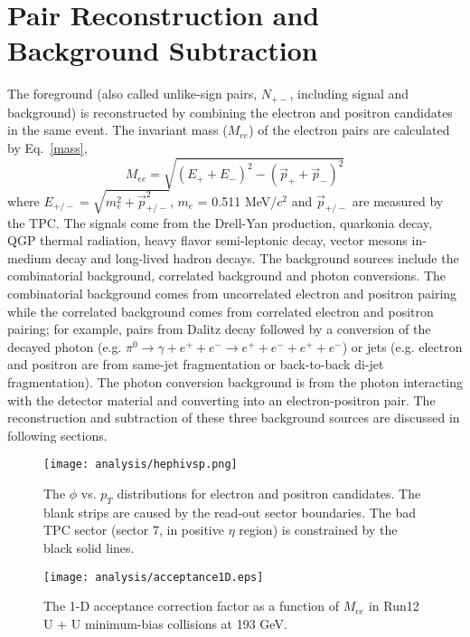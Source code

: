 \section{Pair Reconstruction and Background Subtraction}
\label{invmass}
The foreground (also called unlike-sign pairs, $N_{+-}$, including signal and background) is reconstructed by combining the electron and positron candidates in the same event. The invariant mass ($M_{ee}$) of the electron pairs are calculated by Eq.~\ref{mass}, 
\begin{equation}
M_{ee} = \sqrt{ (E_{+} + E_{-})^{2} - (\overrightarrow{p}_{+} + \overrightarrow{p}_{-})^{2}}
\label{mass}
\end{equation}
where $E_{+/-} = \sqrt{m_{e}^{2} + \overrightarrow{p}_{+/-}^{2}}$, $m_{e}$ = 0.511 MeV/$c^{2}$ and $\overrightarrow{p}_{+/-}$ are measured by the TPC. The signals come from the Drell-Yan production, quarkonia decay, QGP thermal radiation, heavy flavor semi-leptonic decay, vector mesons in-medium decay and long-lived hadron decays. The background sources include the combinatorial background, correlated background and photon conversions. The combinatorial background comes from uncorrelated electron and positron pairing while the correlated background comes from correlated electron and positron pairing; for example, pairs from Dalitz decay followed by a conversion of the decayed photon (e.g. $\pi^{0} \rightarrow \gamma + e^{+} + e^{-} \rightarrow e^{+} + e^{-} + e^{+} + e^{-}$) or jets (e.g. electron and positron are from same-jet fragmentation or back-to-back di-jet fragmentation). The photon conversion background is from the photon interacting with the detector material and converting into an electron-positron pair. The reconstruction and subtraction of these three background sources are discussed in following sections.


\begin{figure}[htbp]
\begin{minipage}[htbp]{0.49\linewidth}
\centering
\texttt{[image: analysis/hephivsp.png]}
\caption{The $\phi$ vs. $p_{T}$ distributions for electron and positron candidates. The blank strips are caused by the read-out sector boundaries. The bad TPC sector (sector 7, in positive $\eta$ region) is constrained by the black solid lines.\label{ephivspt}}
\end{minipage}
\hfill
\begin{minipage}[htbp]{0.49\linewidth}
\centering
\texttt{[image: analysis/acceptance1D.eps]} 
\caption{The 1-D acceptance correction factor as a function of $M_{ee}$ in Run12 U + U  minimum-bias collisions at 193 GeV.\label{acc1d}}
\end{minipage}
\end{figure}

